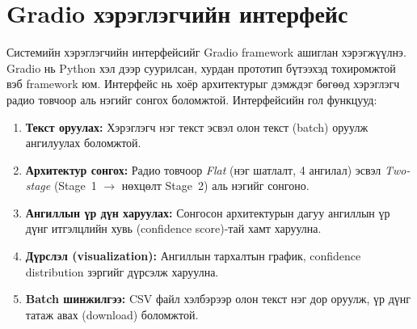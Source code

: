 \section{Gradio хэрэглэгчийн интерфейс}

Системийн хэрэглэгчийн интерфейсийг Gradio framework ашиглан хэрэгжүүлнэ.
Gradio нь Python хэл дээр суурилсан, хурдан прототип бүтээхэд тохиромжтой
вэб framework юм. Интерфейс нь хоёр архитектурыг дэмждэг бөгөөд хэрэглэгч
радио товчоор аль нэгийг сонгох боломжтой. Интерфейсийн гол функцууд:

\begin{enumerate}
  \item \textbf{Текст оруулах:} Хэрэглэгч нэг текст эсвэл олон текст (batch)
        оруулж ангилуулах боломжтой.
  \item \textbf{Архитектур сонгох:} Радио товчоор \textit{Flat} (нэг шатлалт,
        4 ангилал) эсвэл \textit{Two-stage} (Stage~1 $\to$ нөхцөлт Stage~2)
        аль нэгийг сонгоно.
  \item \textbf{Ангиллын үр дүн харуулах:} Сонгосон архитектурын дагуу
        ангиллын үр дүнг итгэлцлийн хувь (confidence score)-тай хамт харуулна.
  \item \textbf{Дүрслэл (visualization):} Ангиллын тархалтын график,
        confidence distribution зэргийг дүрсэлж харуулна.
  \item \textbf{Batch шинжилгээ:} CSV файл хэлбэрээр олон текст нэг дор
        оруулж, үр дүнг татаж авах (download) боломжтой.
\end{enumerate}

